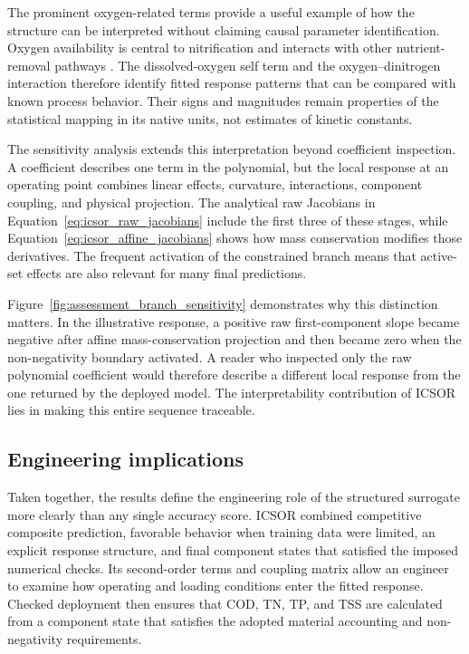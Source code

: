 The prominent oxygen-related terms provide a useful example of how the structure can be interpreted without claiming causal parameter identification. Oxygen availability is central to nitrification and interacts with other nutrient-removal pathways \citep{StenstromSong1991,Wentzel1992}. The dissolved-oxygen self term and the oxygen--dinitrogen interaction therefore identify fitted response patterns that can be compared with known process behavior. Their signs and magnitudes remain properties of the statistical mapping in its native units, not estimates of kinetic constants.

The sensitivity analysis extends this interpretation beyond coefficient inspection. A coefficient describes one term in the polynomial, but the local response at an operating point combines linear effects, curvature, interactions, component coupling, and physical projection. The analytical raw Jacobians in Equation~\eqref{eq:icsor_raw_jacobians} include the first three of these stages, while Equation~\eqref{eq:icsor_affine_jacobians} shows how mass conservation modifies those derivatives. The frequent activation of the constrained branch means that active-set effects are also relevant for many final predictions.

Figure~\ref{fig:assessment_branch_sensitivity} demonstrates why this distinction matters. In the illustrative response, a positive raw first-component slope became negative after affine mass-conservation projection and then became zero when the non-negativity boundary activated. A reader who inspected only the raw polynomial coefficient would therefore describe a different local response from the one returned by the deployed model. The interpretability contribution of ICSOR lies in making this entire sequence traceable.

\subsection{Engineering implications}

Taken together, the results define the engineering role of the structured surrogate more clearly than any single accuracy score. ICSOR combined competitive composite prediction, favorable behavior when training data were limited, an explicit response structure, and final component states that satisfied the imposed numerical checks. Its second-order terms and coupling matrix allow an engineer to examine how operating and loading conditions enter the fitted response. Checked deployment then ensures that COD, TN, TP, and TSS are calculated from a component state that satisfies the adopted material accounting and non-negativity requirements.

